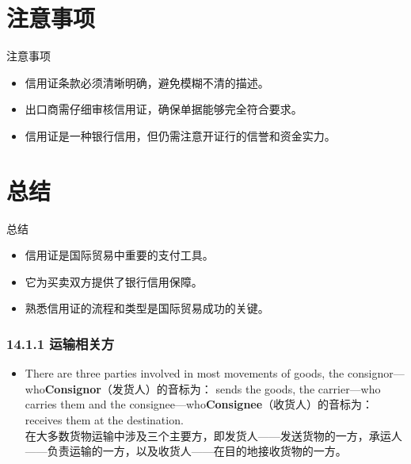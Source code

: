 \documentclass[12pt]{beamer}
\begin{document}
\section{注意事项}
\begin{frame}{注意事项}
    \begin{itemize}
        \item 信用证条款必须清晰明确，避免模糊不清的描述。
        \item 出口商需仔细审核信用证，确保单据能够完全符合要求。
        \item 信用证是一种银行信用，但仍需注意开证行的信誉和资金实力。
    \end{itemize}
\end{frame}

\section{总结}
\begin{frame}{总结}
    \begin{itemize}
        \item 信用证是国际贸易中重要的支付工具。
        \item 它为买卖双方提供了银行信用保障。
        \item 熟悉信用证的流程和类型是国际贸易成功的关键。
    \end{itemize}
\end{frame}





\begin{frame}[allowframebreaks]
    \frametitle{14.1.1 运输相关方}
    \begin{itemize}
    \item There are three parties involved in most movements of goods, the consignor—who\textbf{Consignor}（发货人）的音标为：\textipa{[kənˈsaɪnə(r)]} sends the goods, the carrier—who carries them and the consignee—who\textbf{Consignee}（收货人）的音标为：\textipa{[kənˈsaɪniː]} receives them at the destination. \\
    在大多数货物运输中涉及三个主要方，即发货人——发送货物的一方，承运人——负责运输的一方，以及收货人——在目的地接收货物的一方。
    \end{itemize}
    \end{frame}
    
\end{document}
